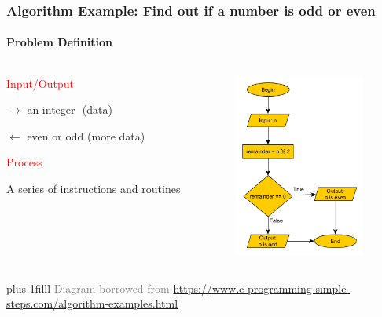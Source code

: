 \documentclass{beamer}
\newcommand{\btVFill}{\vskip0pt plus 1filll}
\newcommand{\light}[1]{\textcolor{gray}{#1}}
\newcommand{\red}[1]{\textcolor{red}{#1}}
\begin{document}
\begin{frame}
\frametitle{Algorithm Example: Find out if a number is odd or even}
\framesubtitle{Problem Definition}
\begin{columns}

\begin{column}{0.5\textwidth}
\red{Input/Output}

$\rightarrow$ an integer\,\,\,\,(data)

$\leftarrow$ even or odd 	(more data)	\pause 

\bigskip
\red{Process}

A series of instructions and routines
\end{column}

\begin{column}{0.4\textwidth}
\begin{center}
\includegraphics[width=43mm]{img/even-or-odd.png}
\end{center}
\end{column}
\end{columns}
\btVFill
\onslide
\footnotesize
\light{Diagram borrowed from 
\url{https://www.c-programming-simple-steps.com/algorithm-examples.html}}
\end{frame}
\end{document}
